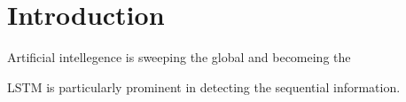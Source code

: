 \section{Introduction}
Artificial intellegence is sweeping the global and becomeing the 

LSTM is particularly prominent in detecting the sequential information. 